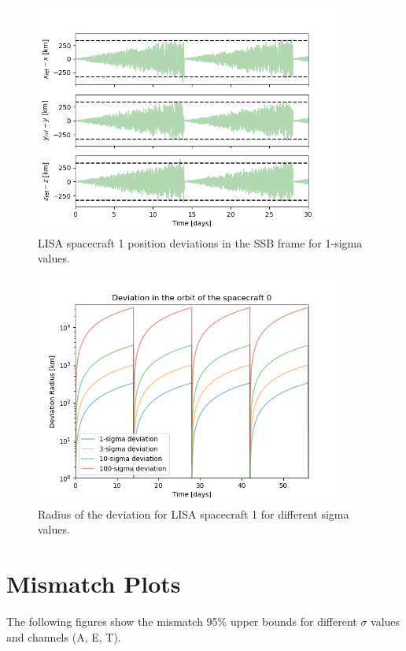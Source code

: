 \documentclass[a4paper,12pt]{article}
\begin{document}
\begin{figure}
    \centering
    \includegraphics[width=0.9\textwidth]{figures/orbits_deviation.png}
    \caption{LISA spacecraft 1 position deviations in the SSB frame for 1-sigma values.}
    \label{fig:sc_deviation}
\end{figure}

\begin{figure}
    \centering
    \includegraphics[width=0.9\textwidth]{figures/radius_deviation.png}
    \caption{Radius of the deviation for LISA spacecraft 1 for different sigma values.}
    \label{fig:sc_radius_deviation}
\end{figure}


\section{Mismatch Plots}
The following figures show the mismatch 95\% upper bounds for different $\sigma$ values and channels (A, E, T).
\end{document}
